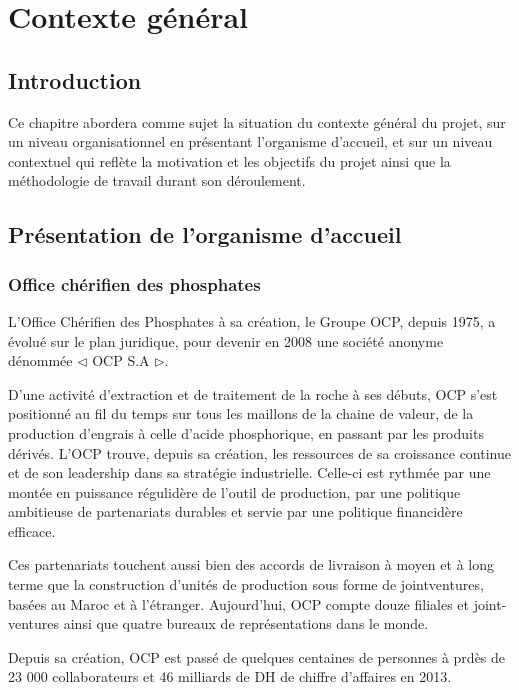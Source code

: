 \chapter{Contexte g\'en\'eral}
\section{Introduction}
Ce chapitre abordera comme sujet la situation du contexte g\'en\'eral du projet, sur un niveau organisationnel en pr\'esentant l'organisme d'accueil, et sur un niveau contextuel qui refl\`ete la motivation et les objectifs du projet ainsi que la m\'ethodologie de travail durant son d\'eroulement.
\section{Pr\'esentation de l'organisme d'accueil}

\subsection{Office ch\'erifien des phosphates}

L'Office Ch\'erifien des Phosphates \`a sa cr\'eation, le Groupe OCP, depuis 1975, a \'evolu\'e sur le plan juridique, pour devenir en 2008 une soci\'et\'e anonyme d\'enomm\'ee ${\triangleleft}$ OCP S.A ${\triangleright}$.

D'une activit\'e d'extraction et de traitement de la roche \`a ses d\'ebuts, OCP s'est positionn\'e au fil du temps sur tous les maillons de la chaine de valeur, de la production d'engrais \`a celle d'acide phosphorique, en passant par les produits d\'eriv\'es. L'OCP trouve, depuis sa cr\'eation, les ressources de sa croissance continue et de son leadership dans sa strat\'egie industrielle. Celle-ci est rythm\'ee par une mont\'ee en puissance r\'egulid\`ere de l'outil de production, par une politique ambitieuse de partenariats durables et servie par une politique financid\`ere efficace.

Ces partenariats touchent aussi bien des accords de livraison \`a moyen et \`a long terme que la construction d'unit\'es de production sous forme de jointventures, bas\'ees au Maroc et \`a l'\'etranger. Aujourd'hui, OCP compte douze filiales et joint-ventures ainsi que quatre bureaux de repr\'esentations dans le monde.

Depuis sa cr\'eation, OCP est pass\'e de quelques centaines de personnes \`a prd\`es de 23 000 collaborateurs et 46 milliards de DH de chiffre d'affaires en 2013.

